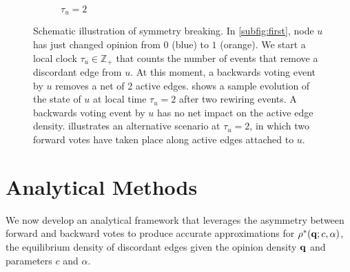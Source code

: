 \documentclass[review, onefignum, onetabnum]{siamart171218}
\begin{document}
\begin{figure}
\begin{subfigure}{.3\textwidth}
				\caption{$\tau_u = 2$}\label{subfig:third}
			\end{subfigure}
			\caption{
				Schematic illustration of symmetry breaking.
				In \cref{subfig:first},  node $u$ has just changed opinion from $0$ (blue) to $1$ (orange). 
				We start a local clock $\tau_u \in \mathbb{Z}_+$ that counts the number of events that remove a discordant edge from $u$. 
				At this moment, a backwards voting event by $u$ removes a net of 2 active edges.  
				 shows a sample evolution of the state of $u$ at local time $\tau_u = 2$ after two rewiring events. 
				A backwards voting event by $u$ has no net impact on the active edge density. 
				 illustrates an alternative scenario at $\tau_u = 2$, in which two forward votes have taken place along active edges attached to $u$. 
				}\label{fig:breaking_illustration}
		\end{figure}

\section{Analytical Methods}
	We now develop an analytical framework that leverages the asymmetry between forward and backward votes to produce accurate approximations for $\rho^*(\mathbf{q}; c, \alpha)$, the equilibrium density of discordant edges given the opinion density $\mathbf{q}$ and parameters $c$ and $\alpha$. 
\end{document}
